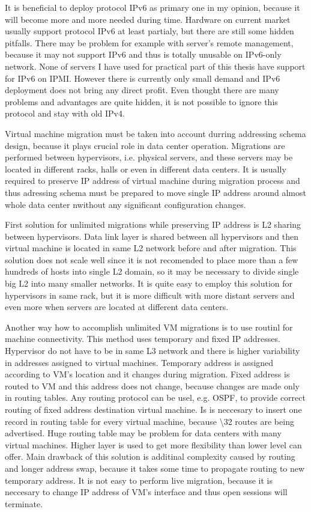 It is beneficial to deploy protocol \Ac{IPv6} as primary one in my opinion, because it will become more and more needed during time. Hardware on current market usually support protocol \Ac{IPv6} at least partialy, but there are still some hidden pitfalls. There may be problem for example with server's remote management, because it may not support \Ac{IPv6} and thus is totally unusable on \Ac{IPv6}-only network. None of servers I have used for practical part of this thesis have support for \Ac{IPv6} on \Ac{IPMI}. 
However there is currently only small demand and \Ac{IPv6} deployment does not bring any direct profit. Even thought there are many problems and advantages are quite hidden, it is not possible to ignore this protocol and stay with old \Ac{IPv4}.

Virtual machine migration must be taken into account durring addressing schema design, because it plays crucial role in data center operation. Migrations are performed between hypervisors, i.e. physical servers, and these servers may be located in different racks, halls or even in different data centers. It is usually required to preserve \Ac{IP} address of virtual machine during migration process and thus adressing schema must be prepared to move single \Ac{IP} address around almost whole data center nwithout any significant configuration changes. 

First solution for unlimited migrations while preserving \Ac{IP} address is L2 sharing between hypervisors. Data link layer is shared between all hypervisors and then virtual machine is located in same L2 network before and after migration. This solution does not scale well since it is not recomended to place more than a few hundreds of hosts into single L2 domain, so it may be necessary to divide single big L2 into many smaller networks. It is quite easy to employ this solution for hypervisors in same rack, but it is more difficult with more distant servers and even more when servers are located at different data centers.

Another way how to accomplish unlimited \Ac{VM} migrations is to use routinl for machine connectivity. This method uses temporary and fixed \Ac{IP} addresses. Hypervisor do not have to be in same L3 network and there is higher variability in addresses assigned to virtual machines. Temporary address is assigned according to \Ac{VM}'s location and it changes during migration. Fixed address is routed to \Ac{VM} and this address does not change, because changes are made only in routing tables. Any routing protocol can be usel, e.g. \Ac{OSPF}, to provide correct routing of fixed address destination virtual machine. Is is neccesary to insert one record in routing table for every virtual machine, because \textbackslash 32 routes are being advertised. Huge routing table may be problem for data centers with many virtual machines.
Higher layer is used to get more flexibility than lower level can offer. Main drawback of this solution is additinal complexity caused by routing and longer address swap, because it takes some time to propagate routing to new temporary address. It is not easy to perform live migration, because it is neccesary to change \Ac{IP} address of \Ac{VM}'s interface and thus open sessions will terminate.

